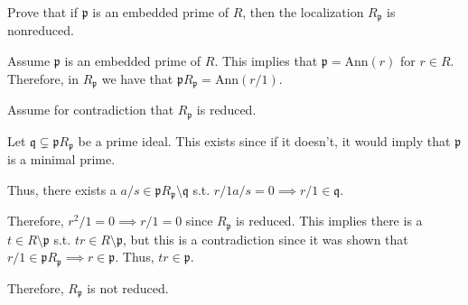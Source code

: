\documentclass[12pt, letterpaper]{article}
\newcommand{\p}{\mathfrak{p}}
\newcommand{\Ann}{\mathrm{Ann}}
\newcommand{\mf}[1]{\mathfrak{#1}}
\begin{document}
\begin{subproblem}{}
    Prove that if $\p$ is an embedded prime of $R$, then the localization $R_\p$ is nonreduced.
\end{subproblem}
\begin{problemproof}
    Assume $\p$ is an embedded prime of $R$. This implies that $\p=\Ann(r)$ for $r \in R$.
    Therefore, in $R_\p$ we have that $\p R_\p = \Ann(r/1)$.
    
    Assume for contradiction that $R_\p$ is reduced.

    Let $\mf{q} \subsetneq \mf{p} R_\p$ be a prime ideal. This exists since if it doesn't, it would imply that $\p$ is a minimal prime.

    Thus, there exists a $a/s \in \mf{p} R_\p \setminus \mf{q}$ s.t. $r/1 a/s = 0 \implies r/1 \in \mf{q}$.

    Therefore, $r^2/1 = 0 \implies r/1=0$ since $R_\p$ is reduced. This implies there is a $t \in R \setminus \p$ s.t. $tr \in R \setminus \p$, but this is a contradiction since it was shown that $r/1 \in \p R_\p \implies r \in \p$. Thus, $tr \in \p$.

    Therefore, $R_\p$ is not reduced.
\end{problemproof}
\end{document}
